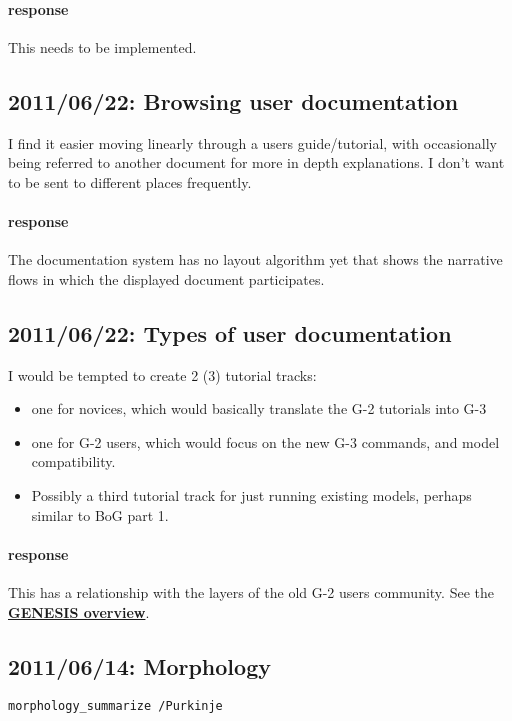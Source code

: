 \documentclass[12pt]{article}
\begin{document}
\paragraph{response} This needs to be implemented.


\subsection{2011/06/22: Browsing user documentation}

I find it easier moving linearly through a users guide/tutorial, with
occasionally being referred to another document for more in depth
explanations.  I don't want to be sent to different places frequently.

\paragraph{response} The documentation system has no layout algorithm
yet that shows the narrative flows in which the displayed document
participates.


\subsection{2011/06/22: Types of user documentation}

I would be tempted to create 2 (3) tutorial tracks:
\begin{itemize}
\item one for novices, which would basically translate the G-2 tutorials
  into G-3
\item one for G-2 users, which would focus on the new G-3 commands,
  and model compatibility.
\item Possibly a third tutorial track for just running existing
  models, perhaps similar to BoG part 1.
\end{itemize}

\paragraph{response} This has a relationship with the layers of the
old G-2 users community.  See the
\href{../genesis-overview/genesis-overview.tex}{\bf GENESIS overview}.


\subsection{2011/06/14: Morphology}

\begin{verbatim}
morphology_summarize /Purkinje
\end{verbatim}
\end{document}

